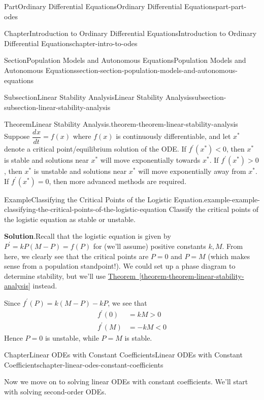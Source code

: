 \documentclass[twoside,10pt,]{book}
\newcommand{\blocktitlefont}{\relax}
\newcommand{\xreffont}{\relax}
\numberwithin{equation}{part}
\newcommand{\dv}[3][]{\dfrac{d^{#1} #2}{d #3^{#1}}}
\newcommand{\lt}{<}
\newcommand{\gt}{>}
\begin{document}
\begin{partptx}{Part}{Ordinary Differential Equations}{}{Ordinary Differential Equations}{}{}{part-part-odes}
\begin{chapterptx}{Chapter}{Introduction to Ordinary Differential Equations}{}{Introduction to Ordinary Differential Equations}{}{}{chapter-intro-to-odes}
\begin{sectionptx}{Section}{Population Models and Autonomous Equations}{}{Population Models and Autonomous Equations}{}{}{section-section-population-models-and-autonomous-equations}
\begin{subsectionptx}{Subsection}{Linear Stability Analysis}{}{Linear Stability Analysis}{}{}{subsection-subsection-linear-stability-analysis}
\begin{theorem}{Theorem}{Linear Stability Analysis.}{}{theorem-theorem-linear-stability-analysis}
Suppose \(\dv{x}{t} = f(x)\) where \(f(x)\) is continuously differentiable, and let \(x^{*}\) denote a critical point\slash{}equilibrium solution of the ODE. If \(f^\prime (x^{*}) \lt 0\), then \(x^{*}\) is stable and solutions near \(x^{*}\) will move exponentially towards \(x^{*}\). If \(f^\prime (x^{*}) \gt 0\), then \(x^{*}\) is unstable and solutions near \(x^{*}\) will move exponentially away from \(x^{*}\). If \(f^\prime (x^{*}) = 0\), then more advanced methods are required.%
\end{theorem}
\begin{example}{Example}{Classifying the Critical Points of the Logistic Equation.}{example-example-classifying-the-critical-points-of-the-logistic-equation}%
Classify the critical points of the logistic equation as stable or unstable.%
\par\smallskip%
\noindent\textbf{\blocktitlefont Solution}.\hypertarget{solution-example-classifying-the-critical-points-of-the-logistic-equation-c}{}\quad{}Recall that the logistic equation is given by \(P^\prime = kP(M-P) = f(P)\) for (we'll assume) positive constants \(k,M\). From here, we clearly see that the critical points are \(P = 0\) and \(P = M\) (which makes sense from a population standpoint!). We could set up a phase diagram to determine stability, but we'll use \hyperref[theorem-theorem-linear-stability-analysis]{Theorem~{\xreffont\ref{theorem-theorem-linear-stability-analysis}}} instead.%
\par
Since \(f^\prime (P) = k(M-P) - kP\), we see that%
\begin{align*}
f^\prime (0) & = kM \gt 0\\
f^\prime (M) & = -kM \lt 0 
\end{align*}
Hence \(P = 0\) is unstable, while \(P = M\) is stable.%
\end{example}
\end{subsectionptx}
\end{sectionptx}
\end{chapterptx}
%
\typeout{************************************************}
\typeout{************************************************}
%
\begin{chapterptx}{Chapter}{Linear ODEs with Constant Coefficients}{}{Linear ODEs with Constant Coefficients}{}{}{chapter-linear-odes-constant-coefficients}
\renewcommand*{\chaptername}{Chapter}
\begin{introduction}{}%
Now we move on to solving linear ODEs with constant coefficients. We'll start with solving second-order ODEs.%

\end{introduction}
\end{chapterptx}
\end{partptx}
\end{document}
